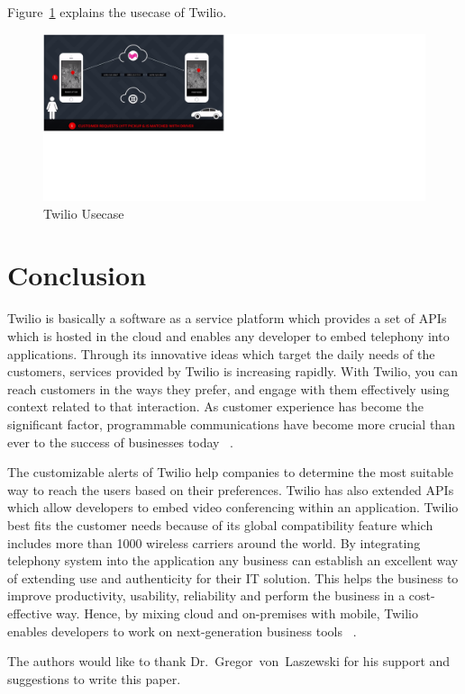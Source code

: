 Figure~\ref{f:usecase} explains the usecase of Twilio.


\begin{figure}[!ht]
  \centering\includegraphics[width=\columnwidth]{image/Twilio-Usecase.png}
  \caption{Twilio Usecase~\cite{hid-sp18-406-twilio-usecase-image}}
\label{f:usecase}
\end{figure}



\section{Conclusion}
Twilio is basically a software as a service platform which provides a set of 
APIs which is hosted in the cloud and enables any developer to embed telephony 
into applications. Through its innovative ideas which target the daily needs of 
the customers, services provided by Twilio is increasing rapidly. With Twilio, 
you can reach customers in the ways they prefer, and engage with them 
effectively using context related to that interaction. As customer experience 
has become the significant factor, programmable communications have become more 
crucial than ever to the success of businesses today
~\cite{hid-sp18-406-twilio-conclusion1}. 
 
The customizable alerts of Twilio help companies to determine the most suitable 
way to reach the users based on their preferences. Twilio has also extended APIs 
which allow developers to embed video conferencing within an application. Twilio
best fits the customer needs because of its global compatibility feature which 
includes more than 1000 wireless carriers around the world. By integrating  
telephony system into the application any business can establish an excellent 
way of extending use and authenticity for their IT solution. This helps the 
business to improve productivity, usability, reliability and perform the 
business in a cost-effective way. Hence, by mixing cloud and on-premises with 
mobile, Twilio enables developers to work on next-generation business tools
~\cite{hid-sp18-406-twilio-conclusion2}.

\begin{acks}

  The authors would like to thank Dr.~Gregor~von~Laszewski for his
  support and suggestions to write this paper.

\end{acks}


 


